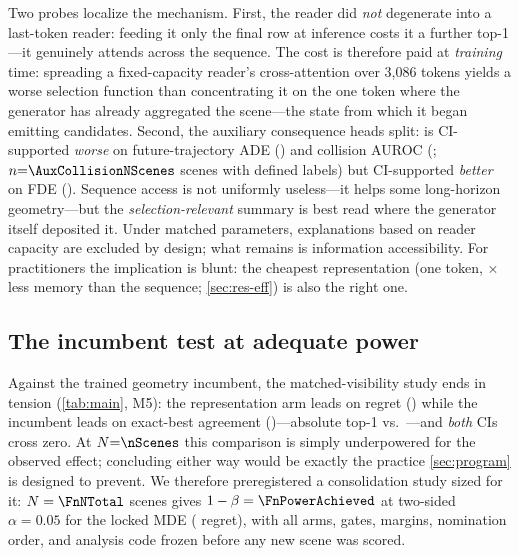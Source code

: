 Two probes localize the mechanism.
First, the \Lfull{} reader did \emph{not} degenerate into a last-token reader: feeding it only the final row at inference costs it a further \AblLastTokenDiagTopOneCI{} top-1---it genuinely attends across the sequence.
The cost is therefore paid at \emph{training} time: spreading a fixed-capacity reader's cross-attention over 3{,}086 tokens yields a worse selection function than concentrating it on the one token where the generator has already aggregated the scene---the state from which it began emitting candidates.
Second, the auxiliary consequence heads split: \Lfull{} is CI-supported \emph{worse} on future-trajectory ADE (\AuxAdeCI) and collision AUROC (\AuxCollisionCI; $n{=}\AuxCollisionNScenes$ scenes with defined labels) but CI-supported \emph{better} on FDE (\AuxFdeCI).
Sequence access is not uniformly useless---it helps some long-horizon geometry---but the \emph{selection-relevant} summary is best read where the generator itself deposited it.
Under matched parameters, explanations based on reader capacity are excluded by design; what remains is information accessibility.
For practitioners the implication is blunt: the cheapest representation (one token, \EffMemRatio$\times$ less memory than the sequence; \cref{sec:res-eff}) is also the right one.

\subsection{The incumbent test at adequate power}
\label{sec:res-incumbent}

Against the trained geometry incumbent, the matched-visibility study ends in tension (\cref{tab:main}, M5): the representation arm leads on regret (\MFiveKEightRegretCI) while the incumbent leads on exact-best agreement (\MFiveKEightTopOneCI)---absolute top-1 \AbsLegacyKEightTopOne{} vs.\ \AbsLasttokenKEightTopOne---and \emph{both} CIs cross zero.
At $N{=}\nScenes$ this comparison is simply underpowered for the observed effect; concluding either way would be exactly the practice \cref{sec:program} is designed to prevent.
We therefore preregistered a consolidation study sized for it: $N=\FnNTotal$ scenes gives $1-\beta=\FnPowerAchieved$ at two-sided $\alpha=0.05$ for the locked MDE (\FnMde{} regret), with all arms, gates, margins, nomination order, and analysis code frozen before any new scene was scored.

